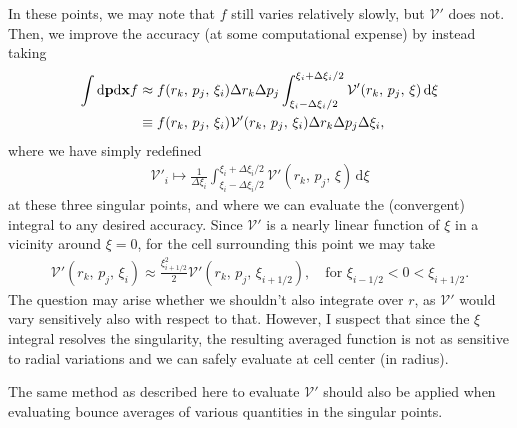 \documentclass[11pt,a4paper]{article}
\newcommand{\rd}{\ensuremath{\mathrm{d}}}
\newcommand{\Vp}{\ensuremath{\mathcal{V}'} }
\renewcommand{\b}[1]{\ensuremath{ {\bf #1 } }}
\begin{document}
In these points, we may note that $f$ still varies relatively slowly, but \Vp{} does not. Then, we improve the accuracy (at some computational expense) by instead taking
\begin{align}
\int \rd \b{p} \rd \b{x}  f &\approx f(r_k,\, p_j ,\,\xi_i) \Delta r_k \Delta p_j \int_{\xi_i-\Delta \xi_i/2}^{\xi_i+\Delta \xi_i/2} \Vp(r_k,\,p_j,\,\xi) \,\rd\xi \nonumber \\
&\equiv f(r_k,\,p_j,\,\xi_i) \mathcal{V}'(r_k,\,p_j,\,\xi_i) \Delta r_k \Delta p_j \Delta \xi_i,
\end{align}
where we have simply redefined
\begin{align}
\Vp_i \mapsto \frac{1}{\Delta \xi_i}\int_{\xi_i-\Delta \xi_i/2}^{\xi_i+\Delta \xi_i/2} \Vp(r_k,\,p_j,\,\xi) \,\rd\xi 
\end{align}
at these three singular points, and where we can evaluate the (convergent) integral to any desired accuracy. Since \Vp{} is a nearly linear function of $\xi$ in a vicinity around $\xi=0$, for the cell surrounding this point we may take
\begin{align}
\Vp(r_k,\,p_j,\,\xi_i) \approx \frac{\xi_{i+1/2}^2}{2} \Vp(r_k,\,p_j,\,\xi_{i+1/2}), \quad \text{for } \xi_{i-1/2} < 0 < \xi_{i+1/2}.
\end{align}
The question may arise whether we shouldn't also integrate over $r$, as \Vp would vary sensitively also with respect to that. However, I suspect that since the $\xi$ integral resolves the singularity, the resulting averaged function is not as sensitive to radial variations and we can safely evaluate at cell center (in radius).

The same method as described here to evaluate \Vp should also be applied when evaluating bounce averages of various quantities in the singular points.
\end{document}

